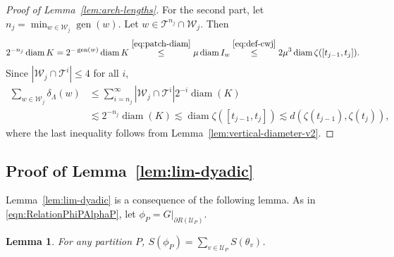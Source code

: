 \documentclass[12pt,reqno]{amsart}
\newcommand{\cT}{\mathcal{T}}
\newcommand{\cU}{\mathcal{U}}
\newcommand{\cW}{\mathcal{W}}
\DeclareMathOperator{\gen}{gen}
\newtheorem{lemma}[thm]{Lemma}
\theoremstyle{remark}
\newcommand{\0}{\mathbf{0}}
\renewcommand{\1}{\mathbf 1}
\DeclareMathOperator{\diam}{diam}
\begin{document}
\begin{proof}[Proof of Lemma~\ref{lem:arch-lengths}]
  For the second part, let $n_j = \min_{w\in \cW_j} \gen(w)$. Let $w\in \cT^{n_j}\cap \cW_j$. Then
  $$2^{-n_j} \diam K = 2^{-\gen(w)} \diam K \stackrel{\eqref{eq:patch-diam}}{\le} \mu \diam I_w \stackrel{\eqref{eq:def-cwj}}{\le} 2\mu^3 \diam \zeta([t_{j-1},t_j]).$$
  Since $|\cW_j \cap \cT^i| \le 4$ for all $i$,
  \[
  \begin{aligned}
    \sum_{w\in \cW_j} \delta_\Lambda(w) &\leq \sum_{i=n_j}^\infty |\cW_j \cap \cT^i| 2^{-i}\diam(K)\\ 
    &\lesssim 2^{-n_j}\diam(K)
    \lesssim \diam \zeta([t_{j-1},t_j])\lesssim d(\zeta(t_{j-1}),\zeta(t_j)),
  \end{aligned}
\]
where the last inequality follows from Lemma~\ref{lem:vertical-diameter-v2}.
  \end{proof}

\subsection{Proof of Lemma~\ref{lem:lim-dyadic}}\label{sec:proof-dyadic}
Lemma~\ref{lem:lim-dyadic} is a consequence of the following lemma. As in \eqref{eqn:RelationPhiPAlphaP}, let $\phi_P = G|_{\partial R(\cU_P)}$.
\begin{lemma}\label{lem:area-phi-P}
  For any partition $P$, $S(\phi_P) = \sum_{v\in \cU_P} S(\theta_v)$.
\end{lemma}
  
\end{document}
